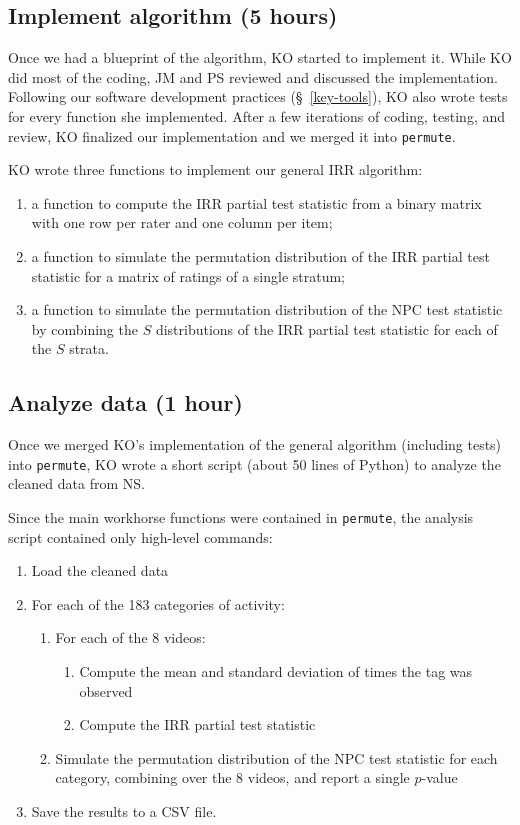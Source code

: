 \documentclass[]{article}
\begin{document}
\subsection{Implement algorithm (5 hours)}

Once we had a blueprint of the algorithm, KO started to implement it.
While KO did most of the coding, JM and PS reviewed and discussed the
implementation.
Following our software development practices (\S~\ref{key-tools}), KO also
wrote tests for every function she implemented.
After a few iterations of coding, testing, and review, KO finalized our implementation
and we merged it into \texttt{permute}.

KO wrote three functions to implement our general IRR algorithm:
\begin{enumerate}
\item a function to compute the IRR partial test statistic from a binary
  matrix with one row per rater and one column per item;
\item a function to simulate the permutation distribution of the IRR partial
  test statistic for a matrix of ratings of a single stratum;
\item a function to simulate the permutation distribution of the NPC
  test statistic by combining the $S$ distributions of the IRR partial test 
  statistic for each of the $S$ strata.
\end{enumerate}

\subsection{Analyze data (1 hour)}

Once we merged KO's implementation of the general algorithm (including tests)
into \texttt{permute}, KO wrote a short script (about 50 lines of Python) to
analyze the cleaned data from NS.

Since the main workhorse functions were contained in \texttt{permute}, 
the analysis script contained only high-level commands:
\begin{enumerate}
\item Load the cleaned data
\item For each of the 183 categories of activity:
  \begin{enumerate}
    \item For each of the 8 videos:
    \begin{enumerate}
      \item Compute the mean and standard deviation of times the
        tag was observed
      \item Compute the IRR partial test statistic
    \end{enumerate}
    \item Simulate the permutation distribution of the NPC test statistic for each
    category, combining over the $8$ videos, and report a single $p$-value
  \end{enumerate}
\item Save the results to a CSV file.
\end{enumerate}
\end{document}
